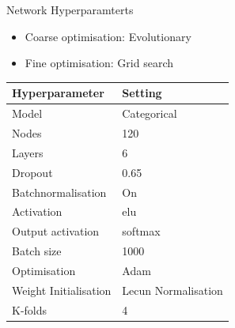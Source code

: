 \documentclass[10pt, UKenglish]{beamer}
\begin{document}
\begin{frame}{Network Hyperparamterts}
  \begin{itemize}
    \item Coarse optimisation: Evolutionary
    \item Fine optimisation: Grid search
  \end{itemize}
    \begin{table}[]
    \begin{tabular}{|l|l|}
    \hline
    Hyperparameter          &     Setting              \\ \hline
    Model                   &     Categorical          \\ \hline
    Nodes                   &     120                  \\ \hline
    Layers                  &     6                    \\ \hline
    Dropout                 &     0.65                 \\ \hline
    Batchnormalisation      &     On                   \\ \hline
    Activation              &     elu                  \\ \hline
    Output activation       &     softmax              \\ \hline
    Batch size              &     1000                 \\ \hline
    Optimisation            &     Adam                 \\ \hline
    Weight Initialisation   &     Lecun Normalisation  \\ \hline
    K-folds                 &     4                    \\ \hline
    \end{tabular}
    \end{table}
\end{frame}
%
\end{document}
